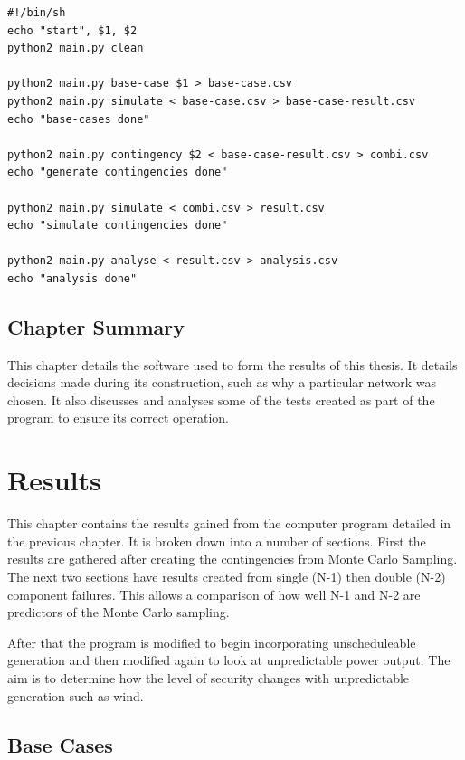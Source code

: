 \documentclass[a4paper,oneside,12pt]{report}
\begin{document}
\begin{verbatim}
#!/bin/sh
echo "start", $1, $2
python2 main.py clean

python2 main.py base-case $1 > base-case.csv
python2 main.py simulate < base-case.csv > base-case-result.csv
echo "base-cases done"

python2 main.py contingency $2 < base-case-result.csv > combi.csv
echo "generate contingencies done"

python2 main.py simulate < combi.csv > result.csv
echo "simulate contingencies done"

python2 main.py analyse < result.csv > analysis.csv
echo "analysis done"
\end{verbatim}


\section{Chapter Summary}

This chapter details the software used to form the results of this thesis. It details decisions made during its construction, such as why a particular network was chosen. It also discusses and analyses some of the tests created as part of the program to ensure its correct operation.






\chapter{Results}

This chapter contains the results gained from the computer program detailed in the previous chapter. It is broken down into a number of sections. First the results are gathered after creating the contingencies from Monte Carlo Sampling. The next two sections have results created from single (N-1) then double (N-2) component failures. This allows a comparison of how well N-1 and N-2 are predictors of the Monte Carlo sampling.

After that the program is modified to begin incorporating unscheduleable generation and then modified again to look at unpredictable power output. The aim is to determine how the level of security changes with unpredictable generation such as wind.

\section{Base Cases}
\end{document}
